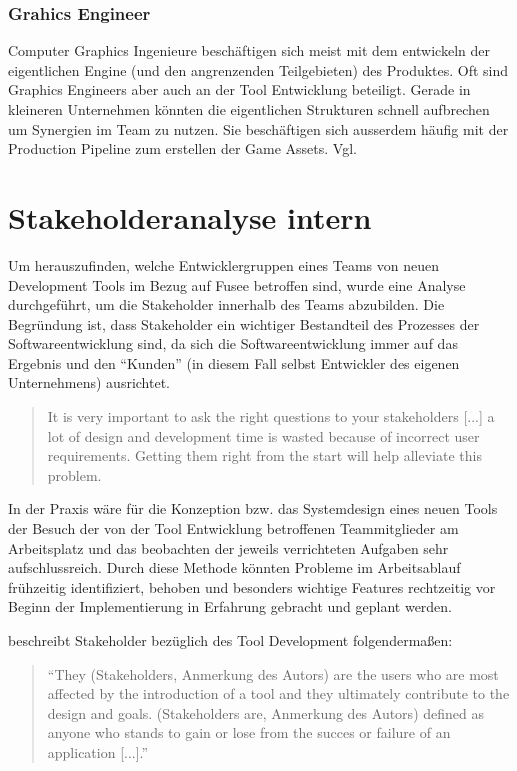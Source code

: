\documentclass[pagesize, paper=a4, fontsize=12pt,titlepage=true, headings=small, headnosepline, abstractoff, liststotoc, nochapterprefix, plainheadsepline, twoside]{scrreprt}
\begin{document}
\subsubsection{Grahics Engineer}
Computer Graphics Ingenieure beschäftigen sich meist mit dem entwickeln der eigentlichen Engine (und den angrenzenden Teilgebieten) des Produktes. Oft sind Graphics Engineers aber auch an der Tool Entwicklung beteiligt. Gerade in kleineren Unternehmen könnten die eigentlichen Strukturen schnell aufbrechen um Synergien im Team zu nutzen. Sie beschäftigen sich ausserdem häufig mit der Production Pipeline zum erstellen der Game Assets. Vgl. \autocite[S. 27 ]{Chandler2006}

\section{Stakeholderanalyse intern}
Um herauszufinden, welche Entwicklergruppen eines Teams von neuen Development Tools im Bezug auf Fusee betroffen sind, wurde eine Analyse durchgeführt, um die Stakeholder innerhalb des Teams abzubilden. Die Begründung ist, dass Stakeholder ein wichtiger Bestandteil des Prozesses der Softwareentwicklung sind, da sich die Softwareentwicklung immer auf das Ergebnis und den “Kunden” (in diesem Fall selbst Entwickler des eigenen Unternehmens) ausrichtet.

\begin{quote}
It is very important to ask the right questions to your stakeholders [...] a lot of design and development time is wasted because of incorrect user requirements. Getting them right from the start will help alleviate this problem.
\autocite[S. 28]{Wihlidal2006}
\end{quote}

In der Praxis wäre für die Konzeption bzw. das Systemdesign eines neuen Tools der Besuch der von der Tool Entwicklung betroffenen Teammitglieder am Arbeitsplatz und das beobachten der jeweils verrichteten Aufgaben sehr aufschlussreich. Durch diese Methode könnten Probleme im Arbeitsablauf frühzeitig identifiziert, behoben und besonders wichtige Features rechtzeitig vor Beginn der Implementierung in Erfahrung gebracht und geplant werden.

\autocite{Wihlidal2006} beschreibt Stakeholder bezüglich des Tool Development folgendermaßen:
\begin{quote}
“They (Stakeholders, Anmerkung des Autors) are the users who are most affected by the introduction of a tool and they ultimately contribute to the design and goals. (Stakeholders are, Anmerkung des Autors) defined as anyone who stands to gain or lose from the succes or failure of an application [...].” \autocite[S. 4-5]{Wihlidal2006}
\end{quote}
\end{document}

